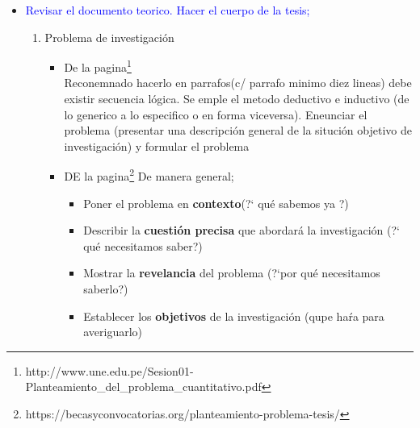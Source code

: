 \documentclass[a4paper,14pt]{article}
\begin{document}
\begin{itemize}
\item \textcolor{blue}{Revisar el documento teorico. Hacer el cuerpo de la tesis;}
\begin{enumerate}
\item Problema de investigación
\begin{itemize}
\item De la pagina\footnote{http://www.une.edu.pe/Sesion01-Planteamiento\_del\_problema\_cuantitativo.pdf}\\
Reconemnado hacerlo en parrafos(c/ parrafo minimo diez lineas) debe existir secuencia lógica. Se emple el metodo deductivo e inductivo (de lo generico a lo especifico o en forma viceversa). Eneunciar el problema (presentar una descripción general de la situción objetivo de investigación) y formular el problema 
\item DE la pagina\footnote{https://becasyconvocatorias.org/planteamiento-problema-tesis/}
De manera general;
\begin{itemize}
\item Poner el problema en \textbf{contexto}(?` qué sabemos ya ?)
\item Describir la \textbf{cuestión precisa} que abordará la investigación (?` qué necesitamos saber?)
\item Mostrar la \textbf{revelancia} del problema (?`por qué necesitamos saberlo?)
\item Establecer los \textbf{objetivos} de la investigación (qupe haŕa para averiguarlo)
\end{itemize}


\end{itemize}
\end{enumerate}
\end{itemize}
\end{document}
